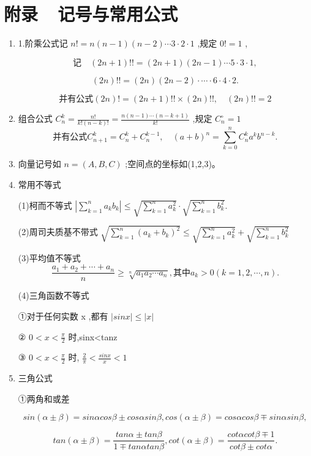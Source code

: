 \documentclass[UTF8]{ctexart}
\theoremstyle{remark}
\begin{document}
\section*{附录~~记号与常用公式}
\begin{enumerate}
	\item 1.阶乘公式记 \(n !=n(n-1)(n-2) \cdots 3 \cdot 2 \cdot 1\) ,规定 \(0 !=1\) ,
	
	\[记 \quad(2 n+1) ! !=(2 n+1)(2 n-1) \cdots 5 \cdot 3 \cdot 1 ,\]
	
	\[(2 n) ! !=(2 n)(2 n-2) \cdot \cdots \cdot 6 \cdot 4 \cdot 2 .\]
	
	\[并有公式 (2 n) !=(2 n+1) ! ! \times(2 n) ! !, \quad(2 n) ! !=2\]
	
	\item 组合公式 \(C_{n}^{k}=\frac{n !}{k !(n-k) !}=\frac{n(n-1) \cdots(n-k+1)}{k !}\) ,规定 \(C_{n}^{\circ}=1\) 
	\[并有公式 C_{n+1}^{k}=C_{n}^{k}+C_{n}^{k-1}, \quad(a+b)^{n}=\sum_{k=0}^{n} C_{n}^{k} a^{k} b^{n-k} .\]
	
	\item 向量记号如 \(n=(A, B, C)\) ;空间点的坐标如(1,2,3)。
	\item 常用不等式
	
	(1)柯而不等式 \(|\sum_{k=1}^{n} a_{k} b_{k}| ≤\sqrt{\sum_{k=1}^{n} a_{k}^{2}} \cdot \sqrt{\sum_{k=1}^{n} b_{k}^{2}} .\)
	
	(2)周司夫质基不带式 \(\sqrt{\sum_{k=1}^{n}(a_{k}+b_{k})^{2}} ≤\sqrt{\sum_{k=1}^{n} a_{k}^{2}}+\sqrt{\sum_{k=1}^{n} b_{k}^{2}}\)
	
	(3)平均值不等式 
	\[\frac{a_{1}+a_{2}+\cdots+a_{n}}{n} \geq \sqrt[n]{a_{1} a_{2} \cdots a_{n}}, 其中 a_{k}>0(k=1,2, \cdots, n) .\]
	
	(4)三角函数不等式
	
	①对于任何实数 x ,都有 \(|sin x| \leqslant|x|\) 
	
	② \(0<x<\frac{\pi}{2}\) 时,sinx<tanz
	
	③ \(0<x<\frac{\pi}{2}\) 时, \(\frac{2}{\pi}<\frac{sin x}{x}<1\)
	\item 三角公式
	
	①两角和或差 
	
	\[sin (\alpha \pm \beta)=sin \alpha cos \beta \pm cos \alpha sin \beta, cos (\alpha \pm \beta)=cos \alpha cos \beta \mp sin \alpha sin \beta,\]
	
	\[tan (\alpha \pm \beta)=\frac{tan \alpha \pm tan \beta}{1 \mp tan \alpha tan \beta}, cot (\alpha \pm \beta)=\frac{cot \alpha cot \beta \mp 1}{cot \beta \pm cot \alpha} .\]
	

\end{enumerate}
\end{document}
